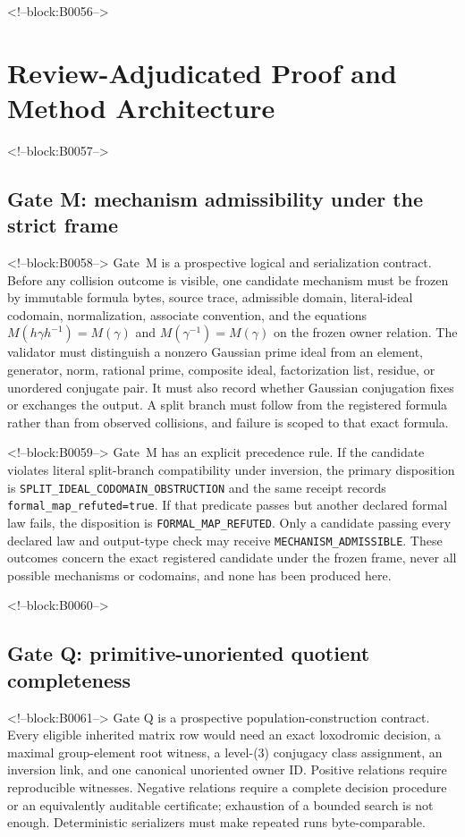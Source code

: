 \documentclass[11pt,a4paper]{article}
\begin{document}
<!--block:B0056-->
\section{Review-Adjudicated Proof and Method Architecture}

<!--block:B0057-->
\subsection{Gate M: mechanism admissibility under the strict frame}

<!--block:B0058-->
Gate~M is a prospective logical and serialization contract. Before any collision outcome is visible, one candidate mechanism must be frozen by immutable formula bytes, source trace, admissible domain, literal-ideal codomain, normalization, associate convention, and the equations \(M(h\gamma h^{-1})=M(\gamma)\) and \(M(\gamma^{-1})=M(\gamma)\) on the frozen owner relation. The validator must distinguish a nonzero Gaussian prime ideal from an element, generator, norm, rational prime, composite ideal, factorization list, residue, or unordered conjugate pair. It must also record whether Gaussian conjugation fixes or exchanges the output. A split branch must follow from the registered formula rather than from observed collisions, and failure is scoped to that exact formula.

<!--block:B0059-->
Gate~M has an explicit precedence rule. If the candidate violates literal split-branch compatibility under inversion, the primary disposition is \texttt{SPLIT\_IDEAL\_CODOMAIN\_OBSTRUCTION} and the same receipt records \texttt{formal\_map\_refuted=true}. If that predicate passes but another declared formal law fails, the disposition is \texttt{FORMAL\_MAP\_REFUTED}. Only a candidate passing every declared law and output-type check may receive \texttt{MECHANISM\_ADMISSIBLE}. These outcomes concern the exact registered candidate under the frozen frame, never all possible mechanisms or codomains, and none has been produced here.

<!--block:B0060-->
\subsection{Gate Q: primitive-unoriented quotient completeness}

<!--block:B0061-->
Gate Q is a prospective population-construction contract. Every eligible inherited matrix row would need an exact loxodromic decision, a maximal group-element root witness, a level-(3) conjugacy class assignment, an inversion link, and one canonical unoriented owner ID. Positive relations require reproducible witnesses. Negative relations require a complete decision procedure or an equivalently auditable certificate; exhaustion of a bounded search is not enough. Deterministic serializers must make repeated runs byte-comparable.
\end{document}
